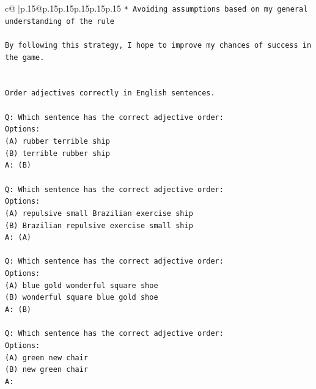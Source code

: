 \documentclass{article}
\begin{document}
{\begin{supertabular}{c@{$\;$}|p{.15\linewidth}@{}p{.15\linewidth}p{.15\linewidth}p{.15\linewidth}p{.15\linewidth}p{.15\linewidth}}
{{{\texttt{* Avoiding assumptions based on my general understanding of the rule} \\
\\ 
\texttt{By following this strategy, I hope to improve my chances of success in the game.} \\
\\ 
\\ 
\texttt{Order adjectives correctly in English sentences.} \\
\\ 
\texttt{Q: Which sentence has the correct adjective order:} \\
\texttt{Options:} \\
\texttt{(A) rubber terrible ship} \\
\texttt{(B) terrible rubber ship} \\
\texttt{A: (B)} \\
\\ 
\texttt{Q: Which sentence has the correct adjective order:} \\
\texttt{Options:} \\
\texttt{(A) repulsive small Brazilian exercise ship} \\
\texttt{(B) Brazilian repulsive exercise small ship} \\
\texttt{A: (A)} \\
\\ 
\texttt{Q: Which sentence has the correct adjective order:} \\
\texttt{Options:} \\
\texttt{(A) blue gold wonderful square shoe} \\
\texttt{(B) wonderful square blue gold shoe} \\
\texttt{A: (B)} \\
\\ 
\texttt{Q: Which sentence has the correct adjective order:} \\
\texttt{Options:} \\
\texttt{(A) green new chair} \\
\texttt{(B) new green chair} \\
\texttt{A:} \\
            }
        }
    }
     \\ \\


\end{supertabular}}
\end{document}
